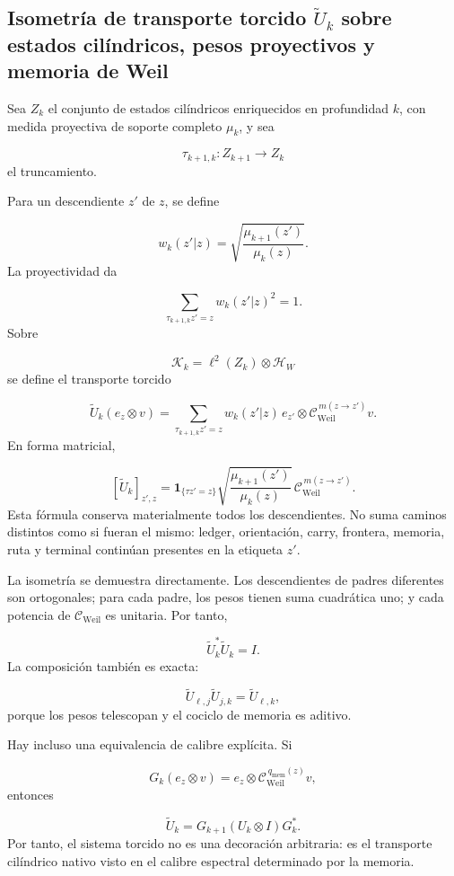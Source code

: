 \subsection{Isometría de transporte torcido \(\widetilde U_k\) sobre estados cilíndricos, pesos proyectivos y memoria de Weil}
Sea \(Z_k\) el conjunto de estados cilíndricos enriquecidos en profundidad \(k\), con medida proyectiva de soporte completo \(\mu_k\), y sea\par
\[
\tau_{k+1,k}:Z_{k+1}\longrightarrow Z_k
\]
el truncamiento.\par
Para un descendiente \(z'\) de \(z\), se define\par
\[
w_k(z'|z)
=
\sqrt{\frac{\mu_{k+1}(z')}{\mu_k(z)}}.
\]
La proyectividad da\par
\[
\sum_{\tau_{k+1,k}z'=z}w_k(z'|z)^2=1.
\]
Sobre\par
\[
\mathscr K_k
=
\ell^2(Z_k)\otimes\mathcal H_W
\]
se define el transporte torcido\par
\[
\widetilde U_k(e_z\otimes v)
=
\sum_{\tau_{k+1,k}z'=z}
w_k(z'|z)\,
e_{z'}\otimes
\mathcal C_{\mathrm{Weil}}^{\,m(z\to z')}v.
\]
En forma matricial,\par
\[
[\widetilde U_k]_{z',z}
=
\mathbf 1_{\{\tau z'=z\}}
\sqrt{\frac{\mu_{k+1}(z')}{\mu_k(z)}}
\,
\mathcal C_{\mathrm{Weil}}^{\,m(z\to z')}.
\]
Esta fórmula conserva materialmente todos los descendientes. No suma caminos distintos como si fueran el mismo: ledger, orientación, carry, frontera, memoria, ruta y terminal continúan presentes en la etiqueta \(z'\).\par
La isometría se demuestra directamente. Los descendientes de padres diferentes son ortogonales; para cada padre, los pesos tienen suma cuadrática uno; y cada potencia de \(\mathcal C_{\mathrm{Weil}}\) es unitaria. Por tanto,\par
\[
\widetilde U_k^*\widetilde U_k=I.
\]
La composición también es exacta:\par
\[
\widetilde U_{\ell,j}\widetilde U_{j,k}
=
\widetilde U_{\ell,k},
\]
porque los pesos telescopan y el cociclo de memoria es aditivo.\par
Hay incluso una equivalencia de calibre explícita. Si\par
\[
G_k(e_z\otimes v)
=
e_z\otimes
\mathcal C_{\mathrm{Weil}}^{\,q_{\mathrm{mem}}(z)}v,
\]
entonces\par
\[
\widetilde U_k
=
G_{k+1}(U_k\otimes I)G_k^*.
\]
Por tanto, el sistema torcido no es una decoración arbitraria: es el transporte cilíndrico nativo visto en el calibre espectral determinado por la memoria.\par
